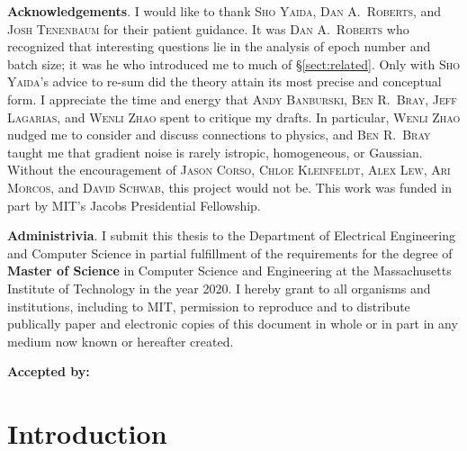 \documentclass[openany, notitlepage, justified]{tufte-book}
\theoremstyle{plain}
\theoremstyle{definition}
\begin{document}
    \vspace{1cm}
    \textbf{Acknowledgements}.
        I would like to thank \textsc{Sho Yaida}, \textsc{Dan A.\ Roberts},
        and \textsc{Josh Tenenbaum} for their patient guidance.
        It was \textsc{Dan A.\ Roberts} who recognized that interesting
        questions lie in the analysis of epoch number and batch size; it was he
        who introduced me to much of \S\ref{sect:related}.  Only with
        \textsc{Sho Yaida}'s advice to re-sum did the theory attain its most
        precise and conceptual form.
        I appreciate the time and energy that \textsc{Andy Banburski},
        \textsc{Ben R.\ Bray}, \textsc{Jeff Lagarias}, and \textsc{Wenli Zhao}
        spent to critique my drafts.  In particular, \textsc{Wenli Zhao}
        nudged me to consider and discuss connections to physics, and
        \textsc{Ben R.\ Bray} taught me that gradient noise is rarely istropic,
        homogeneous, or Gaussian.  
        Without the encouragement of \textsc{Jason Corso}, \textsc{Chloe
        Kleinfeldt}, \textsc{Alex Lew}, \textsc{Ari Morcos}, and \textsc{David
        Schwab}, this project would not be.
        This work was funded in part by MIT's Jacobs Presidential Fellowship.

    \vspace{1cm}
    \textbf{Administrivia}.
        I submit this thesis to the Department of Electrical Engineering and
        Computer Science in partial fulfillment of the requirements for the
        degree of \textbf{Master of Science} in Computer Science and
        Engineering at the Massachusetts Institute of Technology in the year
        2020.  I hereby grant to all organisms and institutions, including to
        MIT, permission to reproduce and to distribute publically paper and
        electronic copies of this document in whole or in part in any medium
        now known or hereafter created.

    \vspace{1cm}
    \textbf{Accepted by:}
        \hrulefill
 
    \restoregeometry
    

\chapter{Introduction}
\end{document}
